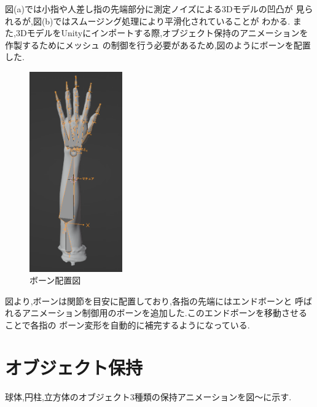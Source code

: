 \documentclass{ltjsreport}
\begin{document}
		図(a)では小指や人差し指の先端部分に測定ノイズによる3Dモデルの凹凸が
		見られるが,図(b)ではスムージング処理により平滑化されていることが
		わかる.
		\clearpage
		\noindent
		また,3DモデルをUnityにインポートする際,オブジェクト保持のアニメーションを作製するためにメッシュ
		の制御を行う必要があるため,図のようにボーンを配置した.
		\begin{figure}[H]
		\centering
		\includegraphics[width = 4cm]{../figs/meshbone.png}
		\caption{ボーン配置図}
		\label{fig:meshbone}
		\end{figure}

		図より,ボーンは関節を目安に配置しており,各指の先端にはエンドボーンと
		呼ばれるアニメーション制御用のボーンを追加した.このエンドボーンを移動させることで各指の
		ボーン変形を自動的に補完するようになっている.

	\section{オブジェクト保持}
		球体,円柱,立方体のオブジェクト3種類の保持アニメーションを図〜に示す.
\end{document}
